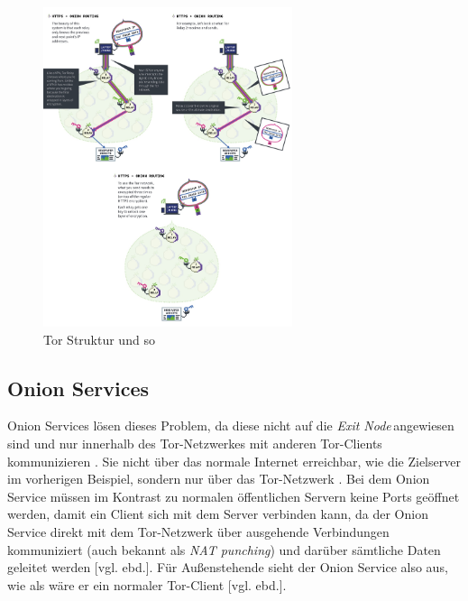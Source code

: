 \documentclass[a4paper,ngerman, headheight=28pt,12pt]{scrartcl}
\newcommand{\vcite}[1]{\cite[vgl.][]{#1}}
\newcommand{\vebd}{[vgl. ebd.]}
\newcommand{\exitn}{\textit{Exit Node\,}}
\begin{document}
\begin{figure}[h]
  \centering
  \includegraphics[width=0.65\textwidth]{tor_vertical.png}
  \caption{Tor Struktur und so \vcite{fig:Tor-Structure} \label{fig:TorStructure}}
\end{figure}
\subsection{Onion Services}
Onion Services lösen dieses Problem, da diese nicht auf die \exitn angewiesen sind und nur innerhalb des Tor-Netzwerkes mit anderen Tor-Clients kommunizieren \vcite{TorOnionServiceTalk}. Sie nicht über das normale Internet erreichbar, wie die Zielserver im vorherigen Beispiel, sondern nur über das Tor-Netzwerk \vcite{TorOnionService}. Bei dem Onion Service müssen im Kontrast zu normalen öffentlichen Servern keine Ports geöffnet werden, damit ein Client sich mit dem Server verbinden kann, da der Onion Service direkt mit dem Tor-Netzwerk über ausgehende Verbindungen kommuniziert (auch bekannt als \textit{NAT punching}) und darüber sämtliche Daten geleitet werden \vebd. Für Außenstehende sieht der Onion Service also aus, wie als wäre er ein normaler Tor-Client \vebd.
\end{document}
